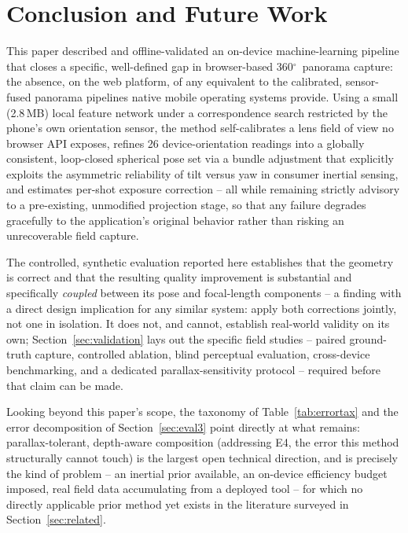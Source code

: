 \documentclass[11pt]{article}
\newcommand{\Deg}{\ensuremath{^{\circ}}}
\begin{document}
\section{Conclusion and Future Work}
\label{sec:conclusion}

This paper described and offline-validated an on-device machine-learning pipeline that closes a specific, well-defined gap in browser-based 360\Deg\ panorama capture: the absence, on the web platform, of any equivalent to the calibrated, sensor-fused panorama pipelines native mobile operating systems provide. Using a small (2.8\,MB) local feature network under a correspondence search restricted by the phone's own orientation sensor, the method self-calibrates a lens field of view no browser API exposes, refines 26 device-orientation readings into a globally consistent, loop-closed spherical pose set via a bundle adjustment that explicitly exploits the asymmetric reliability of tilt versus yaw in consumer inertial sensing, and estimates per-shot exposure correction -- all while remaining strictly advisory to a pre-existing, unmodified projection stage, so that any failure degrades gracefully to the application's original behavior rather than risking an unrecoverable field capture.

The controlled, synthetic evaluation reported here establishes that the geometry is correct and that the resulting quality improvement is substantial and specifically \emph{coupled} between its pose and focal-length components -- a finding with a direct design implication for any similar system: apply both corrections jointly, not one in isolation. It does not, and cannot, establish real-world validity on its own; Section~\ref{sec:validation} lays out the specific field studies -- paired ground-truth capture, controlled ablation, blind perceptual evaluation, cross-device benchmarking, and a dedicated parallax-sensitivity protocol -- required before that claim can be made.

Looking beyond this paper's scope, the taxonomy of Table~\ref{tab:errortax} and the error decomposition of Section~\ref{sec:eval3} point directly at what remains: parallax-tolerant, depth-aware composition (addressing E4, the error this method structurally cannot touch) is the largest open technical direction, and is precisely the kind of problem -- an inertial prior available, an on-device efficiency budget imposed, real field data accumulating from a deployed tool -- for which no directly applicable prior method yet exists in the literature surveyed in Section~\ref{sec:related}.
\end{document}
